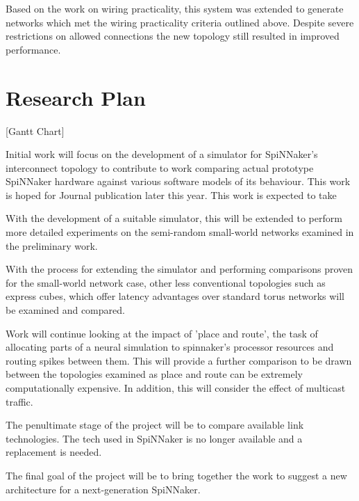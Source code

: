 Based on the work on wiring practicality, this system was extended to generate
networks which met the wiring practicality criteria outlined above. Despite
severe restrictions on allowed connections the new topology still resulted in
improved performance.

\section{Research Plan}

[Gantt Chart]

Initial work will focus on the development of a simulator for SpiNNaker's
interconnect topology to contribute to work comparing actual prototype SpiNNaker
hardware against various software models of its behaviour. This work is hoped
for Journal publication later this year. This work is expected to take 

With the development of a suitable simulator, this will be extended to perform
more detailed experiments on the semi-random small-world networks examined in
the preliminary work.

With the process for extending the simulator and performing comparisons proven
for the small-world network case, other less conventional topologies such as
express cubes, which offer latency advantages over standard torus networks will
be examined and compared.

Work will continue looking at the impact of 'place and route', the task of
allocating parts of a neural simulation to spinnaker's processor resources and
routing spikes between them. This will provide a further comparison to be drawn
between the topologies examined as place and route can be extremely
computationally expensive. In addition, this will consider the effect of
multicast traffic.

The penultimate stage of the project will be to compare available link
technologies. The tech used in SpiNNaker is no longer available and a
replacement is needed.

The final goal of the project will be to bring together the work to suggest a
new architecture for a next-generation SpiNNaker.

